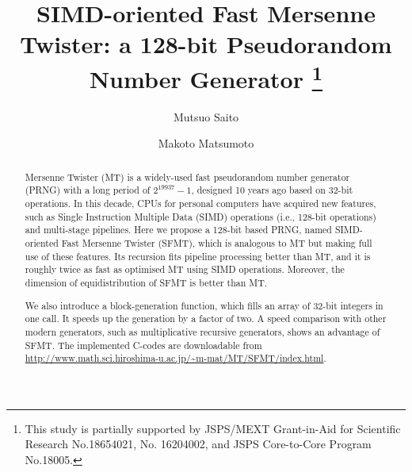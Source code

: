 \documentclass{svmult}
\begin{document}
\title*{SIMD-oriented Fast Mersenne Twister:
a 128-bit Pseudorandom Number Generator
\thanks{This study is partially supported by JSPS/MEXT
Grant-in-Aid for Scientific Research No.18654021, No. 16204002,
and JSPS Core-to-Core Program No.18005.}}
            

\author{Mutsuo Saito\and
Makoto Matsumoto}

\maketitle
            
\begin{abstract} 
Mersenne Twister (MT)
is a widely-used fast pseudorandom number generator (PRNG)
with a long period of $2^{19937}-1$,
designed 10 years ago based on 32-bit operations.
In this decade, CPUs for personal computers
have acquired new features, such as 
Single Instruction Multiple Data (SIMD) operations
(i.e., 128-bit operations) and multi-stage pipelines.
Here we propose a 128-bit based 
PRNG, named SIMD-oriented Fast Mersenne Twister
(SFMT), which is analogous to MT but making full use
of these features. Its recursion fits pipeline processing
better than MT, and it is roughly twice as fast as 
optimised MT using SIMD operations.
Moreover, the dimension of equidistribution of SFMT
is better than MT. 

We also introduce 
a block-generation function, 
which fills an array of 32-bit integers in one call.
It speeds up the generation by a factor of two. 
A speed comparison with other modern generators, 
such as multiplicative recursive generators,
shows an advantage of SFMT. The implemented 
C-codes are downloadable from 
\url{http://www.math.sci.hiroshima-u.ac.jp/~m-mat/MT/SFMT/index.html}.
\end{abstract}
            


\end{document}
